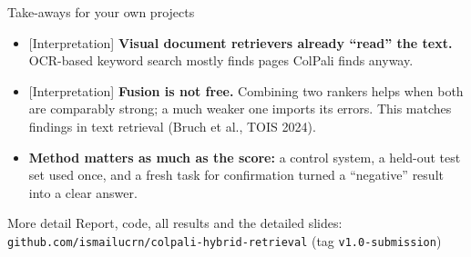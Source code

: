 \documentclass[aspectratio=169,11pt]{beamer}
\newcommand{\lbl}[2]{\textsf{\scriptsize\textcolor{#1}{[#2]}}}
\newcommand{\Int}{\lbl{tagI}{Interpretation}}
\begin{document}
\begin{frame}{Take-aways for your own projects}
\begin{itemize}
  \item \Int{} \textbf{Visual document retrievers already ``read'' the text.} OCR-based keyword search mostly finds pages ColPali finds anyway.
  \item \Int{} \textbf{Fusion is not free.} Combining two rankers helps when both are comparably strong; a much weaker one imports its errors. This matches findings in text retrieval (Bruch et al., TOIS 2024).
  \item \textbf{Method matters as much as the score:} a control system, a held-out test set used once, and a fresh task for confirmation turned a ``negative'' result into a clear answer.
\end{itemize}
\vspace{10pt}
\begin{block}{More detail}
\small Report, code, all results and the detailed slides:\\
\texttt{github.com/ismailucrn/colpali-hybrid-retrieval} \quad(tag \texttt{v1.0-submission})
\end{block}
\end{frame}
\end{document}
